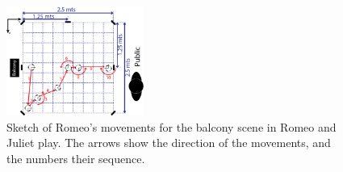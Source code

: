\begin{figure}
	\centering
	\includegraphics[width=0.4\textwidth]{./Images/FourthCaseSceneB.png}
	\caption{Sketch of Romeo's movements for the balcony scene in Romeo and Juliet play. The arrows show the direction of the movements, and the numbers their sequence.}
	\label{fig:triskar_test}
\end{figure} 
